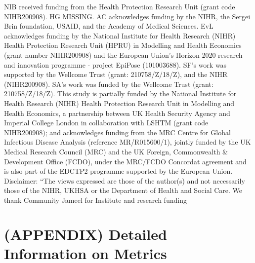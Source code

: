 \documentclass[
]{jss}
\begin{document}
NIB received funding from the Health Protection Research Unit (grant
code NIHR200908). HG MISSING. AC acknowledges funding by the NIHR, the
Sergei Brin foundation, USAID, and the Academy of Medical Sciences. EvL
acknowledges funding by the National Institute for Health Research
(NIHR) Health Protection Research Unit (HPRU) in Modelling and Health
Economics (grant number NIHR200908) and the European Union's Horizon
2020 research and innovation programme - project EpiPose (101003688).
SF's work was supported by the Wellcome Trust (grant: 210758/Z/18/Z),
and the NIHR (NIHR200908). SA's work was funded by the Wellcome Trust
(grant: 210758/Z/18/Z). This study is partially funded by the National
Institute for Health Research (NIHR) Health Protection Research Unit in
Modelling and Health Economics, a partnership between UK Health Security
Agency and Imperial College London in collaboration with LSHTM (grant
code NIHR200908); and acknowledges funding from the MRC Centre for
Global Infectious Disease Analysis (reference MR/R015600/1), jointly
funded by the UK Medical Research Council (MRC) and the UK Foreign,
Commonwealth \& Development Office (FCDO), under the MRC/FCDO Concordat
agreement and is also part of the EDCTP2 programme supported by the
European Union. Disclaimer: ``The views expressed are those of the
author(s) and not necessarily those of the NIHR, UKHSA or the Department
of Health and Social Care. We thank Community Jameel for Institute and
research funding

\newpage

\appendix

\section*{(APPENDIX) Detailed Information on
Metrics}\label{appendix-detailed-information-on-metrics}
\end{document}
